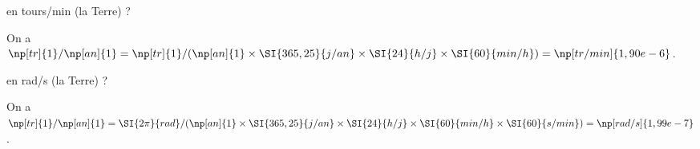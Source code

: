 



\begin{enonce}
en tours/min (la Terre) ?
\end{enonce}


\begin{corrige}
On a $\np[tr]{1}/\np[an]{1}= \np[tr]{1}/(\np[an]{1}\times\SI{365,25}{j/an}\times \SI{24}{h/j} \times \SI{60}{min/h}) = \np[tr/min]{1,90e-6}$.
\end{corrige}



\begin{enonce}
en rad/s (la Terre) ?
\end{enonce}


\begin{corrige}
On a $\np[tr]{1}/\np[an]{1}= \SI{2\pi}{rad}/(\np[an]{1}\times\SI{365,25}{j/an}\times \SI{24}{h/j} \times \SI{60}{min/h} \times \SI{60}{s/min}) = \np[rad/s]{1,99e-7}$.
\end{corrige}


\finEntrainement




